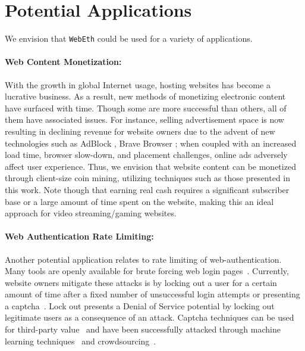 \documentclass[runningheads]{llncs}
\newcommand{\trishita}[1]{}%
\begin{document}
\section{Potential Applications}
\label{sec:applications}
We envision that \verb|WebEth| could be used for a variety of applications.
\paragraph{Web Content Monetization:}
With the growth in global Internet usage, hosting websites has become a lucrative business. As a result, new methods of monetizing electronic content have surfaced with time. Though some are more successful than others, all of them have associated issues. For instance, selling advertisement space is now resulting in declining revenue for website owners due to the advent of new technologies such as AdBlock \cite{Adblock}, Brave Browser \cite{BraveBrowser,decliningRevenue}; when coupled with an increased load time, browser slow-down, and placement challenges, online ads adversely affect user experience.  Thus, we envision that website content can be monetized through client-size coin mining, utilizing techniques such as those presented in this work. Note though that earning real cash requires a significant subscriber base or a large amount of time spent on the website, making this an ideal approach for video streaming/gaming websites.
\paragraph{Web Authentication Rate Limiting:}
Another potential application relates to rate limiting of web-authentication.  Many tools are openly available for brute forcing web login pages~\cite{hydra,burpsuite}. Currently, website owners mitigate these attacks is by locking out a user for a certain amount of time after a fixed number of unsuccessful login attempts or presenting a captcha~\cite{recaptcha}.  
Lock out presents a Denial of Service potential by locking out legitimate users as a consequence of an attack. 
Captcha techniques can be used for third-party value~\cite{von2008recaptcha} and have been successfully attacked through machine learning techniques~\cite{mlCaptcha} and crowdsourcing~\cite{captchaFarms}. 
\end{document}
